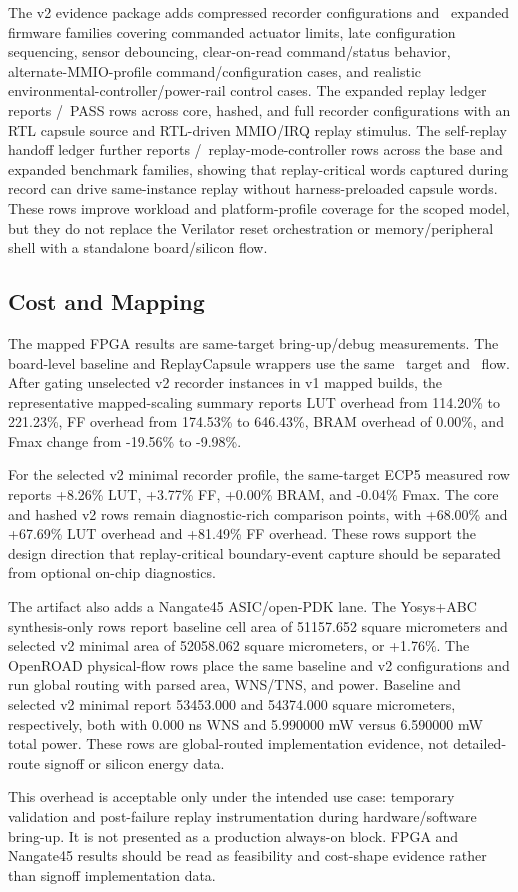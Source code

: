 The v2 evidence package adds compressed recorder configurations and \rcExpandedBenchmarks\ expanded firmware families covering commanded actuator limits, late configuration sequencing, sensor debouncing, clear-on-read command/status behavior, alternate-MMIO-profile command/configuration cases, and realistic environmental-controller/power-rail control cases. The expanded replay ledger reports \rcExpandedReplayPass/\rcExpandedReplayTotal\ PASS rows across core, hashed, and full recorder configurations with an RTL capsule source and RTL-driven MMIO/IRQ replay stimulus. The self-replay handoff ledger further reports \rcSelfReplayPass/\rcSelfReplayTotal\ replay-mode-controller rows across the base and expanded benchmark families, showing that replay-critical words captured during record can drive same-instance replay without harness-preloaded capsule words. These rows improve workload and platform-profile coverage for the scoped model, but they do not replace the Verilator reset orchestration or memory/peripheral shell with a standalone board/silicon flow.

\subsection{Cost and Mapping}

The mapped FPGA results are same-target bring-up/debug measurements. The board-level baseline and ReplayCapsule wrappers use the same \rcMappedTarget\ target and \rcMappedFlow\ flow. After gating unselected v2 recorder instances in v1 mapped builds, the representative mapped-scaling summary reports LUT overhead from 114.20\% to 221.23\%, FF overhead from 174.53\% to 646.43\%, BRAM overhead of 0.00\%, and Fmax change from -19.56\% to -9.98\%.

For the selected v2 minimal recorder profile, the same-target ECP5 measured row reports +8.26\% LUT, +3.77\% FF, +0.00\% BRAM, and -0.04\% Fmax. The core and hashed v2 rows remain diagnostic-rich comparison points, with +68.00\% and +67.69\% LUT overhead and +81.49\% FF overhead. These rows support the design direction that replay-critical boundary-event capture should be separated from optional on-chip diagnostics.

The artifact also adds a Nangate45 ASIC/open-PDK lane. The Yosys+ABC synthesis-only rows report baseline cell area of 51157.652 square micrometers and selected v2 minimal area of 52058.062 square micrometers, or +1.76\%. The OpenROAD physical-flow rows place the same baseline and v2 configurations and run global routing with parsed area, WNS/TNS, and power. Baseline and selected v2 minimal report 53453.000 and 54374.000 square micrometers, respectively, both with 0.000 ns WNS and 5.990000 mW versus 6.590000 mW total power. These rows are global-routed implementation evidence, not detailed-route signoff or silicon energy data.

This overhead is acceptable only under the intended use case: temporary validation and post-failure replay instrumentation during hardware/software bring-up. It is not presented as a production always-on block. FPGA and Nangate45 results should be read as feasibility and cost-shape evidence rather than signoff implementation data.

\ifrcfullartifactpaper

\fi
